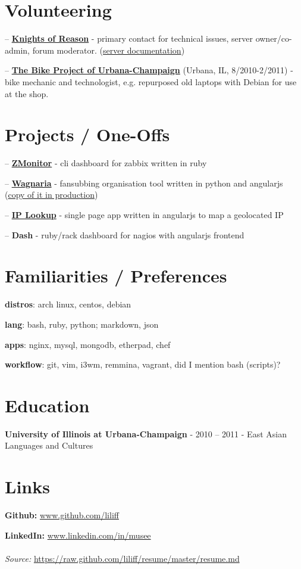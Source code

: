 \documentclass{article}
\begin{document}
\section{Volunteering}

-- \href{http://knightsofreason.net}{\textbf{Knights of Reason}} - primary contact for technical issues, server owner/co-admin, forum moderator. (\href{https://wiki.milkteafuzz.com}{server documentation})\par
-- \href{http://thebikeproject.org}{\textbf{The Bike Project of Urbana-Champaign}} (Urbana, IL, 8/2010-2/2011) - bike mechanic and technologist, e.g. repurposed old laptops with Debian for use at the shop.\par

\section{Projects / One-Offs}

-- \href{https://github.com/liliff/zmonitor}{\textbf{ZMonitor}} - cli dashboard for zabbix written in ruby\par
-- \href{https://github.com/liliff/wagnaria}{\textbf{Wagnaria}} - fansubbing organisation tool written in python and angularjs (\href{https://c.milkteafuzz.com/index.html}{copy of it in production})\par
-- \href{http://ip.milk.tea.jp}{\textbf{IP Lookup}} - single page app written in angularjs to map a geolocated IP\par
-- \textbf{Dash} - ruby/rack dashboard for nagios with angularjs frontend\par

\section{Familiarities / Preferences}

\textbf{distros}: arch linux, centos, debian\par
\textbf{lang}: bash, ruby, python; markdown, json\par
\textbf{apps}: nginx, mysql, mongodb, etherpad, chef\par
\textbf{workflow}: git, vim, i3wm, remmina, vagrant, did I mention bash (scripts)?\par

\section{Education}

\textbf{University of Illinois at Urbana-Champaign} - 2010 -- 2011 - East Asian Languages and Cultures
\section{Links}

\textbf{Github:} \url{www.github.com/liliff}\par
\textbf{LinkedIn:} \url{www.linkedin.com/in/musee}
\\
\\
\textsl{Source:} \url{https://raw.github.com/liliff/resume/master/resume.md}
\end{document}
